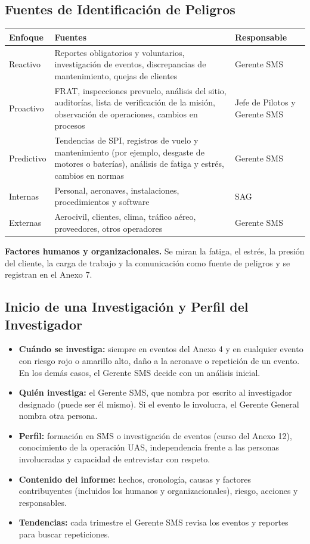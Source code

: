 \subsection{Fuentes de Identificación de Peligros}
\begin{longtable}{|>{\RaggedRight\arraybackslash}p{3cm}|>{\RaggedRight\arraybackslash}p{6.2cm}|>{\RaggedRight\arraybackslash}p{4.4cm}|}
\hline
\rowcolor[gray]{0.9}\textbf{Enfoque} & \textbf{Fuentes} & \textbf{Responsable} \\ \hline
\endhead
Reactivo & Reportes obligatorios y voluntarios, investigación de eventos, discrepancias de mantenimiento, quejas de clientes & Gerente SMS \\ \hline
Proactivo & FRAT, inspecciones prevuelo, análisis del sitio, auditorías, lista de verificación de la misión, observación de operaciones, cambios en procesos & Jefe de Pilotos y Gerente SMS \\ \hline
Predictivo & Tendencias de SPI, registros de vuelo y mantenimiento (por ejemplo, desgaste de motores o baterías), análisis de fatiga y estrés, cambios en normas & Gerente SMS \\ \hline
Internas & Personal, aeronaves, instalaciones, procedimientos y software & SAG \\ \hline
Externas & Aerocivil, clientes, clima, tráfico aéreo, proveedores, otros operadores & Gerente SMS \\ \hline
\end{longtable}

\textbf{Factores humanos y organizacionales.} Se miran la fatiga, el estrés, la presión del cliente, la carga de trabajo y la comunicación como fuente de peligros y se registran en el Anexo 7.

\subsection{Inicio de una Investigación y Perfil del Investigador}
\begin{itemize}
    \item \textbf{Cuándo se investiga:} siempre en eventos del Anexo 4 y en cualquier evento con riesgo rojo o amarillo alto, daño a la aeronave o repetición de un evento. En los demás casos, el Gerente SMS decide con un análisis inicial.
    \item \textbf{Quién investiga:} el Gerente SMS, que nombra por escrito al investigador designado (puede ser él mismo). Si el evento le involucra, el Gerente General nombra otra persona.
    \item \textbf{Perfil:} formación en SMS o investigación de eventos (curso del Anexo 12), conocimiento de la operación UAS, independencia frente a las personas involucradas y capacidad de entrevistar con respeto.
    \item \textbf{Contenido del informe:} hechos, cronología, causas y factores contribuyentes (incluidos los humanos y organizacionales), riesgo, acciones y responsables.
    \item \textbf{Tendencias:} cada trimestre el Gerente SMS revisa los eventos y reportes para buscar repeticiones.
\end{itemize}

